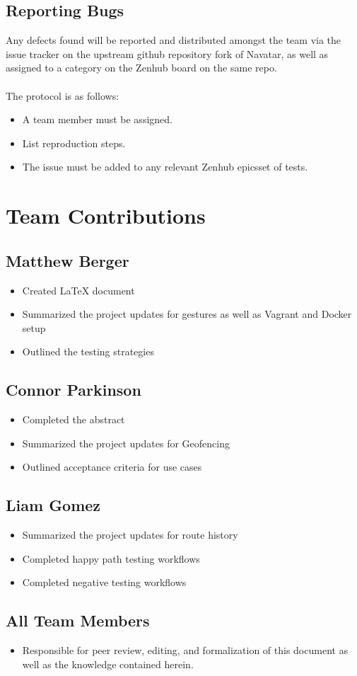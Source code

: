 \documentclass{scrreprt}
\begin{document}
\section{Reporting Bugs}

Any defects found will be reported and distributed amongst the team via the issue tracker on the upstream github repository fork of Navatar, as well as assigned to a category on the Zenhub board on the same repo.\\\\The protocol is as follows:
\begin{itemize}
	\item A team member must be assigned.
	\item List reproduction steps.
	\item The issue must be added to any relevant Zenhub epicsset of tests.
\end{itemize}

\chapter{Team Contributions}
	\section{Matthew Berger}
		\begin{itemize}
			\item Created LaTeX document
			\item Summarized the project updates for gestures as well as Vagrant and Docker setup
			\item Outlined the testing strategies
		\end{itemize}
	\section{Connor Parkinson}
		\begin{itemize}
			\item Completed the abstract
			\item Summarized the project updates for Geofencing
			\item Outlined acceptance criteria for use cases
		\end{itemize}
	\section{Liam Gomez}
		\begin{itemize}
			\item Summarized the project updates for route history
			\item Completed happy path testing workflows
			\item Completed negative testing workflows
		\end{itemize}
	\section{All Team Members}
		\begin{itemize}
			\item Responsible for peer review, editing, and formalization of this document as well as the knowledge contained herein.
		\end{itemize}
\end{document}
